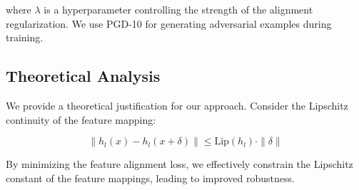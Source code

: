 where $\lambda$ is a hyperparameter controlling the strength of the alignment regularization. We use PGD-10 for generating adversarial examples during training.

\subsection{Theoretical Analysis}
We provide a theoretical justification for our approach. Consider the Lipschitz continuity of the feature mapping:

\begin{equation}
\|h_{l}(x) - h_{l}(x+\delta)\| \leq \text{Lip}(h_{l}) \cdot \|\delta\|
\end{equation}

By minimizing the feature alignment loss, we effectively constrain the Lipschitz constant of the feature mappings, leading to improved robustness.